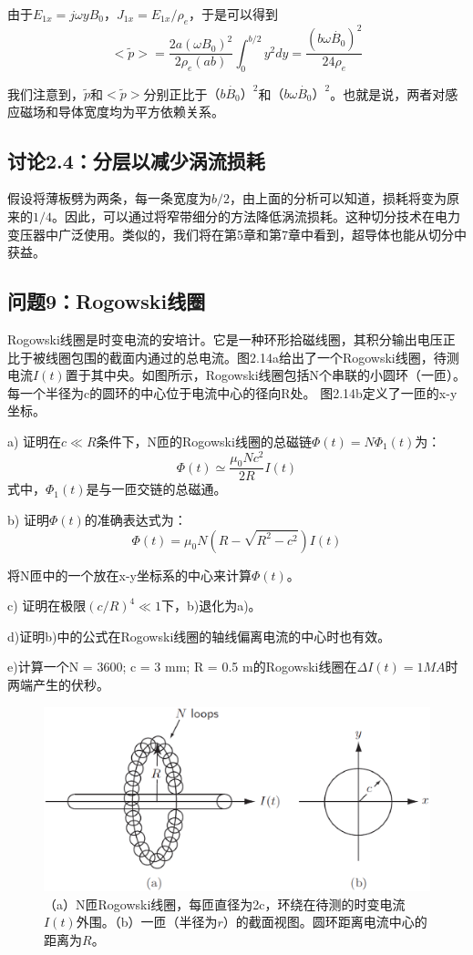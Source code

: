 由于$E_{1x}=j\omega y B_0$，$J_{1x}=E_{1x}/\rho_e$，于是可以得到
$$<\tilde{p}>=\frac{2a(\omega B_0)^2}{2\rho_e (ab)}\int_{0}^{b/2} y^2 dy=\frac{(b\omega\dot{B_0})^2}{24\rho_e}$$

我们注意到，$\tilde{p}$和$<\tilde{p}>$分别正比于$（b\dot{B_0}）^2$和$（b\omega \dot{B_0}）^2$。也就是说，两者对感应磁场和导体宽度均为平方依赖关系。

\subsection{讨论2.4：分层以减少涡流损耗}
假设将薄板劈为两条，每一条宽度为$b/2$，由上面的分析可以知道，损耗将变为原来的$1/4$。因此，可以通过将窄带细分的方法降低涡流损耗。这种切分技术在电力变压器中广泛使用。类似的，我们将在第5章和第7章中看到，超导体也能从切分中获益。


\subsection{问题9：Rogowski线圈}
Rogowski线圈是时变电流的安培计。它是一种环形拾磁线圈，其积分输出电压正比于被线圈包围的截面内通过的总电流。图2.14a给出了一个Rogowski线圈，待测电流$I(t)$置于其中央。如图所示，Rogowski线圈包括N个串联的小圆环（一匝）。每一个半径为c的圆环的中心位于电流中心的径向R处。
图2.14b定义了一匝的x-y坐标。

a) 证明在$c\ll R$条件下，N匝的Rogowski线圈的总磁链$\Phi(t)=N\Phi_1(t)$为：
$$\Phi(t)\simeq\frac{\mu_0 N c^2}{2R}I(t)$$
式中，$\Phi_1(t)$是与一匝交链的总磁通。

b) 证明$\Phi(t)$的准确表达式为：
$$\Phi(t)=\mu_0 N (R-\sqrt{R^2-c^2})I(t)$$

将N匝中的一个放在x-y坐标系的中心来计算$\Phi(t)$。

c) 证明在极限$(c/R)^4\ll 1$下，b)退化为a)。

d)证明b)中的公式在Rogowski线圈的轴线偏离电流的中心时也有效。

e)计算一个N = 3600; c = 3 mm; R = 0.5 m的Rogowski线圈在$\Delta I(t)=1MA$时两端产生的伏秒。

\begin{figure}
  \centering
 \includegraphics[scale=0.4]{chpt2/figs/fig2.14.eps}
  \caption{（a）N匝Rogowski线圈，每匝直径为2c，环绕在待测的时变电流$I(t)$外围。（b）一匝（半径为$r$）的截面视图。圆环距离电流中心的距离为$R$。}
\end{figure}

